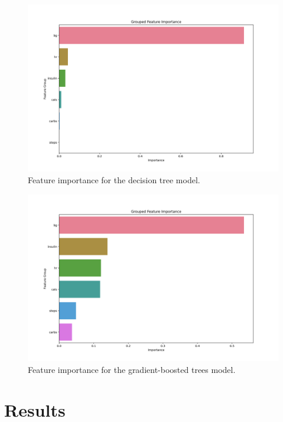 \documentclass[
	a4paper, %
	10pt, %
	unnumberedsections, %
	twoside, %
]{LTJournalArticle}
\begin{document}
\begin{figure}[h!]
	\centering
	\includegraphics[width=1\linewidth]{../project_code/grouped_feature_importance_DT.png}
	\caption{Feature importance for the decision tree model.}
	\label{fig:DT_feature_importance}
\end{figure}

\begin{figure}[h!]
	\centering
	\includegraphics[width=1\linewidth]{../project_code/grouped_feature_importance_GBT.png}
	\caption{Feature importance for the gradient-boosted trees model.}
	\label{fig:GBT_feature_importance}
\end{figure}


\section{Results}
\end{document}
